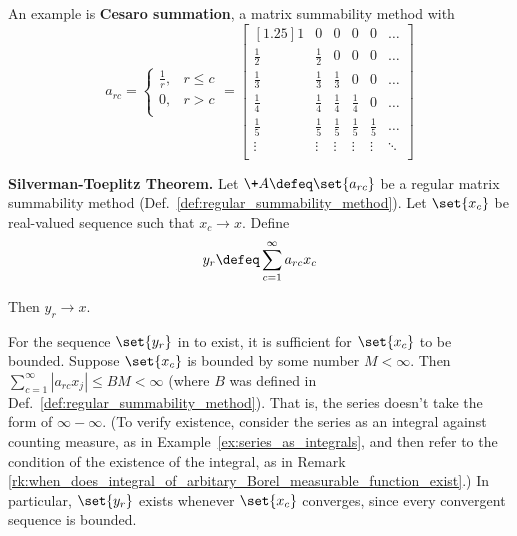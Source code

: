 \documentclass{article} %
\begin{document}
\begin{example}
An example is \textbf{Cesaro summation}, a matrix summability method with
%
\[ 
a_{rc} = 
\begin{cases}
\frac{1}{r}, &  r \leq c \\ 
0, &  r > c \\	
 \end{cases}
=
\begin{bmatrix}[1.25]
1 & 0 & 0 & 0 & 0 & \dots \\
\frac{1}{2} & \frac{1}{2} & 0 & 0 & 0 & \dots \\
\frac{1}{3} & \frac{1}{3} & \frac{1}{3} & 0 & 0 & \dots \\
\frac{1}{4} & \frac{1}{4} & \frac{1}{4} & \frac{1}{4} & 0 & \dots \\
\frac{1}{5} & \frac{1}{5} & \frac{1}{5} & \frac{1}{5} & \frac{1}{5} & \dots \\
\vdots & \vdots &  \vdots &  \vdots &  \vdots & \ddots \\ 
\end{bmatrix}
\]	
\end{example}


\begin{theorem}\textbf{Silverman-Toeplitz Theorem.}
Let $\+A \defeq \set{a_{rc}}$ be a regular matrix summability method (Def.~\ref{def:regular_summability_method}).  Let $\set{x_c}$ be real-valued sequence such that $x_c \to x$.  Define 
\begin{align}
y_r \defeq \sum_{c=1}^\infty a_{rc} x_c
\label{eqn:new_sequence_obtained_by_applying_a_regular_infinite_matrix_to_an_old_sequence}	
\end{align}

Then $y_r \to x.$
\label{thm:silverman_toeplitz}	
\end{theorem}

\begin{remark}
For the sequence $\set{y_r}$ in  to exist, it is sufficient for $\set{x_c}$ to be bounded.  Suppose $\set{x_c}$ is bounded by some number $M<\infty$.  Then $\sum_{c=1}^\infty |a_{rc} x_j| \leq BM < \infty$ (where $B$ was defined in Def.~\ref{def:regular_summability_method}). That is,  the series doesn't take the form of $\infty - \infty$. {\scriptsize (To verify existence,  consider the series as an integral against counting measure, as in Example~\ref{ex:series_as_integrals}, and then refer to the condition of the existence of the integral, as in Remark \ref{rk:when_does_integral_of_arbitary_Borel_measurable_function_exist}.)} In particular, $\set{y_r}$ exists whenever $\set{x_c}$ converges, since every convergent sequence is bounded. %
\end{remark}
\end{document}

